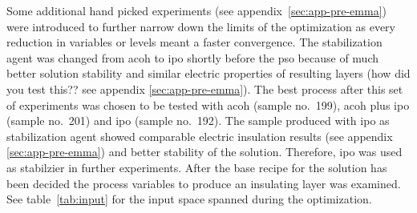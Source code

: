 Some additional hand picked experiments (see appendix~\ref{sec:app-pre-emma}) were introduced to further narrow down the limits of 
the optimization as every reduction in variables or levels meant a faster convergence.
The stabilization agent was changed from \gls{acoh} to \gls{ipo} 
shortly before the \gls{pso}
because of much better solution stability and similar electric properties of resulting layers (how did you test this?? see appendix \ref{sec:app-pre-emma}).
The best process after this set of experiments was chosen to be tested with 
 \gls{acoh} (sample no.~199),  \gls{acoh} plus  \gls{ipo} (sample no.~201) and  \gls{ipo} (sample no.~192).
The sample produced with \gls{ipo} as stabilization agent showed comparable electric insulation results (see appendix \ref{sec:app-pre-emma}) and better stability of the solution. 
Therefore, \gls{ipo} was used  as stabilzier in further experiments.
After the base recipe for the solution has been decided
the process variables to produce an insulating layer was examined. 
See table~\ref{tab:input} for the input space spanned during the optimization.
